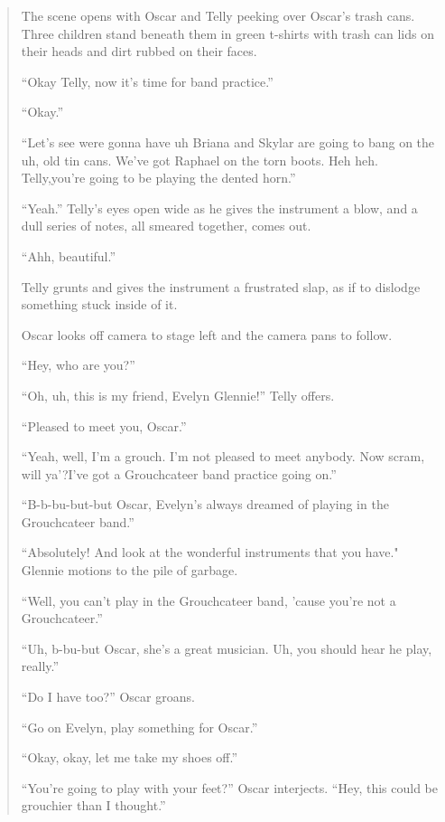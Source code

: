 \documentclass[12pt,letterpaper]{article}
\begin{document}
	\begin{quote}

	\ttfamily
	
	The scene opens with Oscar and Telly peeking over Oscar's trash cans. 
	Three children stand beneath them in green t-shirts with trash can lids
	on their heads and dirt rubbed on their faces.

	``Okay Telly, now it's time for band practice.''

	``Okay.''

	``Let's see were gonna have uh Briana and Skylar are going to bang on 
	the uh, old tin cans. We've got Raphael on the torn boots. Heh heh. 
	Telly,you're going to be playing the dented horn.''

	``Yeah.'' Telly's eyes open wide as he gives the instrument a blow, and 
	a dull series of notes, all smeared together, comes out. 

	``Ahh, beautiful.'' 

	Telly grunts and gives the instrument a frustrated slap, as if to 
	dislodge something stuck inside of it.

	Oscar looks off camera to stage left and the camera pans to follow. 

	``Hey, who are you?''

	``Oh, uh, this is my friend, Evelyn Glennie!'' Telly offers.

	``Pleased to meet you, Oscar.''  

	``Yeah, well, I'm a grouch. I'm not pleased to meet anybody. Now scram, 
	will ya'?I've got a Grouchcateer band practice going on.''

	``B-b-bu-but-but Oscar, Evelyn's always dreamed of playing in the 
	Grouchcateer band.''

	``Absolutely! And look at the wonderful instruments that you have." 
	Glennie motions to the pile of garbage.  

	``Well, you can't play in the Grouchcateer band, 'cause you're not a 
	Grouchcateer.''

	``Uh, b-bu-but Oscar, she's a great musician. Uh, you should hear he 
	play, really.''

	``Do I have too?'' Oscar groans.

	``Go on Evelyn, play something for Oscar.''

	``Okay, okay, let me take my shoes off.''

	``You're going to play with your feet?'' Oscar interjects. ``Hey, this 
	could be grouchier than I thought.''


\end{quote}
\end{document}
